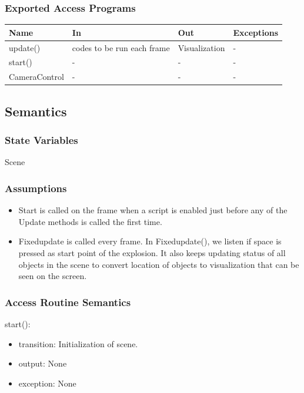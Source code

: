 \documentclass[12pt, titlepage]{article}
\begin{document}
\subsubsection{Exported Access Programs}

\begin{center}
	\begin{tabular}{p{3cm} p{5cm} p{4cm} p{2cm}}
		\hline
		\textbf{Name} & \textbf{In} & \textbf{Out} & \textbf{Exceptions} \\
		\hline
		update() & codes to be run each frame & Visualization & - \\
		start() & - & - & - \\
		CameraControl & - & - & - \\
		\hline
	\end{tabular}
\end{center}

\subsection{Semantics}

\subsubsection{State Variables}
Scene
\subsubsection{Assumptions}

\noindent
\begin{itemize}
	\item Start is called on the frame when a script is enabled just before any of the Update methods is called the first time.
	\item Fixedupdate is called every frame. In Fixedupdate(), we listen if space is pressed as start point of the explosion. It also keeps updating status of all objects in the scene to convert location of objects to visualization that can be seen on the screen.
\end{itemize}

\subsubsection{Access Routine Semantics}

\noindent start():
\begin{itemize}
	\item transition: Initialization of scene.
	\item output: None 
	\item exception: None  
\end{itemize}
\end{document}
